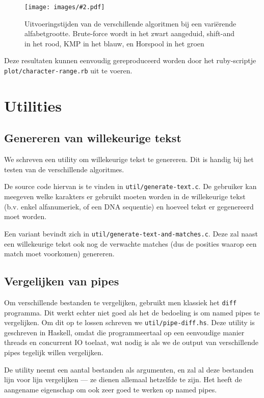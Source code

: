 \documentclass[a4paper,11pt]{article}
\newcommand{\image}[3][1]{
    \begin{figure}
    \begin{center}
    \texttt{[image: images/\#2.pdf]}
    \caption{#3}
    \label{fig:#2}
    \end{center}
    \end{figure}
}
\newcommand{\reproduce}[1]{
    Deze resultaten kunnen eenvoudig gereproduceerd worden door het
    ruby-scriptje \texttt{#1} uit te voeren.
}
\begin{document}
\image{plot-character-range}{Uitvoeringstijden van de verschillende algoritmen
bij een vari\"erende alfabetgrootte. Brute-force wordt in het zwart aangeduid,
shift-and in het rood, KMP in het blauw, en Horspool in het groen}

\reproduce{plot/character-range.rb}

\section{Utilities}

\subsection{Genereren van willekeurige tekst}
\label{generate-text}

We schreven een utility om willekeurige tekst te genereren. Dit is handig bij
het testen van de verschillende algoritmes.

De source code hiervan is te vinden in \verb#util/generate-text.c#. De gebruiker
kan meegeven welke karakters er gebruikt moeten worden in de willekeurige tekst
(b.v. enkel alfanumeriek, of een DNA sequentie) en hoeveel tekst er gegenereerd
moet worden.

\label{generate-text-and-matches}
Een variant bevindt zich in \verb#util/generate-text-and-matches.c#. Deze zal
naast een willekeurige tekst ook nog de verwachte matches (dus de posities
waarop een match moet voorkomen) genereren.

\subsection{Vergelijken van pipes}
\label{pipe-diff}

Om verschillende bestanden te vergelijken, gebruikt men klassiek het \verb#diff#
programma. Dit werkt echter niet goed als het de bedoeling is om named pipes
te vergelijken. Om dit op te lossen schreven we \verb#util/pipe-diff.hs#. Deze
utility is geschreven in Haskell, omdat die programmeertaal op een eenvoudige
manier threads en concurrent IO toelaat, wat nodig is als we de output van
verschillende pipes tegelijk willen vergelijken.

De utility neemt een aantal bestanden als argumenten, en zal al deze bestanden
lijn voor lijn vergelijken — ze dienen allemaal hetzelfde te zijn. Het heeft de
aangename eigenschap om ook zeer goed te werken op named pipes.
\end{document}
